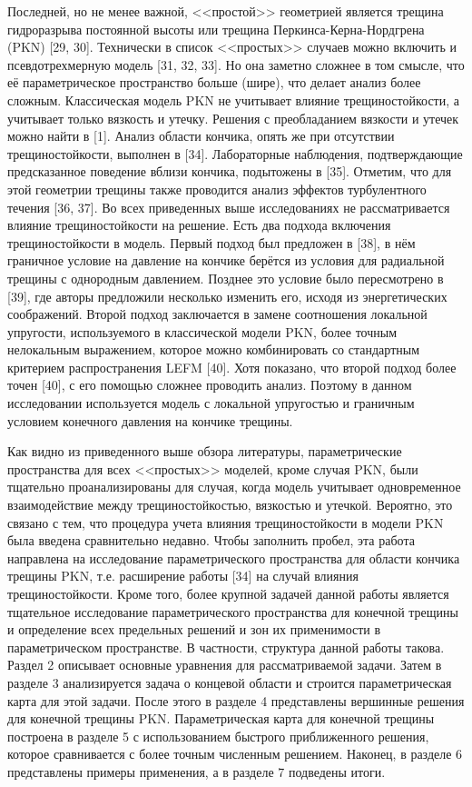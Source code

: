 \documentclass[main.tex]{subfiles}
\begin{document}
Последней, но не менее важной, <<простой>> геометрией является трещина гидроразрыва постоянной высоты или трещина Перкинса-Керна-Нордгрена (PKN) [29, 30].
Технически в список <<простых>> случаев можно включить и псевдотрехмерную модель [31, 32, 33].
Но она заметно сложнее в том смысле, что её параметрическое пространство больше (шире), что делает анализ более сложным.
Классическая модель PKN не учитывает влияние трещиностойкости, а учитывает только вязкость и утечку.
Решения с преобладанием вязкости и утечек можно найти в [1].
Анализ области кончика, опять же при отсутствии трещиностойкости, выполнен в [34].
Лабораторные наблюдения, подтверждающие предсказанное поведение вблизи кончика, подытожены в [35].
Отметим, что для этой геометрии трещины также проводится анализ эффектов турбулентного течения [36, 37].
Во всех приведенных выше исследованиях не рассматривается влияние трещиностойкости на решение.
Есть два подхода включения трещиностойкости в модель.
Первый подход был предложен в [38], в нём граничное условие на давление на кончике берётся из условия для радиальной трещины с однородным давлением.
Позднее это условие было пересмотрено в [39], где авторы предложили несколько изменить его, исходя из энергетических соображений.
Второй подход заключается в замене соотношения локальной упругости, используемого в классической модели PKN, более точным нелокальным выражением, которое можно комбинировать со стандартным критерием распространения LEFM [40].
Хотя показано, что второй подход более точен [40], с его помощью сложнее проводить анализ.
Поэтому в данном исследовании используется модель с локальной упругостью и граничным условием конечного давления на кончике трещины.

Как видно из приведенного выше обзора литературы, параметрические пространства для всех <<простых>> моделей, кроме случая PKN, были тщательно проанализированы для случая, когда модель учитывает одновременное взаимодействие между трещиностойкостью, вязкостью и утечкой.
Вероятно, это связано с тем, что процедура учета влияния трещиностойкости в модели PKN была введена сравнительно недавно.
Чтобы заполнить пробел, эта работа направлена на исследование параметрического пространства для области кончика трещины PKN, т.е. расширение работы [34] на случай влияния трещиностойкости.
Кроме того, более крупной задачей данной работы является тщательное исследование параметрического пространства для конечной трещины и определение всех предельных решений и зон их применимости в параметрическом пространстве.
В частности, структура данной работы такова.
Раздел 2 описывает основные уравнения для рассматриваемой задачи.
Затем в разделе 3 анализируется задача о концевой области и строится параметрическая карта для этой задачи.
После этого в разделе 4 представлены вершинные решения для конечной трещины PKN.
Параметрическая карта для конечной трещины построена в разделе 5 с использованием быстрого приближенного решения, которое сравнивается с более точным численным решением.
Наконец, в разделе 6 представлены примеры применения, а в разделе 7 подведены итоги.
\end{document}

